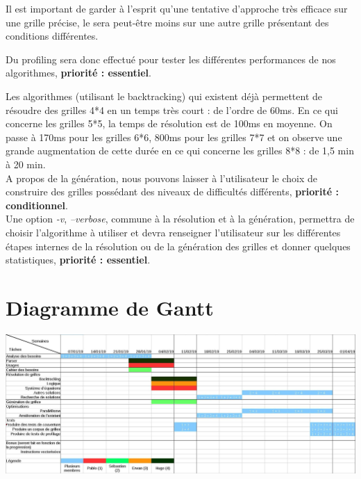 \documentclass[1]{report}
\begin{document}
		Il est important de garder à l'esprit qu'une tentative d'approche très efficace sur une grille précise, le sera peut-être moins sur une autre grille présentant des conditions différentes.

        Du profiling sera donc effectué pour tester les différentes performances de nos algorithmes, \textbf{priorité : essentiel}.

        Les algorithmes (utilisant le backtracking) qui existent déjà permettent de résoudre des grilles 4*4 en un temps très court : de l'ordre de 60ms. En ce qui concerne les grilles 5*5, la temps de résolution est de 100ms en moyenne. On passe à 170ms pour les grilles 6*6, 800ms pour les grilles 7*7 et on observe une grande augmentation de cette durée en ce qui concerne les grilles 8*8 : de 1,5 min à 20 min. \\

        A propos de la génération, nous pouvons laisser à l'utilisateur le choix de construire des grilles possédant des niveaux de difficultés différents, \textbf{priorité : conditionnel}. \\




        Une option \emph{-v}, \emph{--verbose}, commune à la résolution et à la génération, permettra de choisir l'algorithme à utiliser et devra renseigner l'utilisateur sur les différentes étapes internes de la résolution ou de la génération des grilles et donner quelques statistiques, \textbf{priorité : essentiel}. \\





\chapter{Diagramme de Gantt}


     \begin{center}

                \includegraphics[width = 15cm]{Gantt.jpg}

    \end{center}
\end{document}
